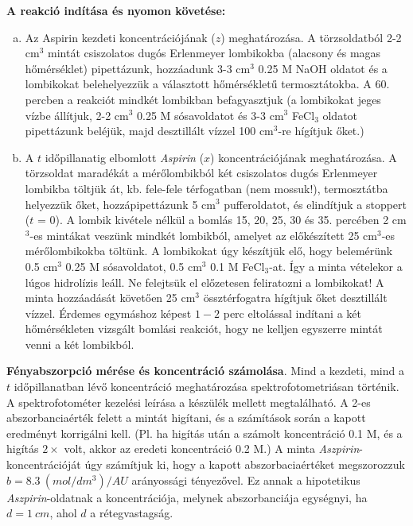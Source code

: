 \textbf{A reakció indítása és nyomon követése:}

\begin{enumerate}[(a)]
\item Az Aspirin kezdeti koncentrációjának ($z$) meghatározása. A törzsoldatból 2-2 cm$^3$ mintát csiszolatos dugós Erlenmeyer lombikokba (alacsony és magas hőmérséklet) pipettázunk, hozzáadunk 3-3 cm$^3$ 0.25 M NaOH oldatot és a lombikokat belehelyezzük a választott hőmérsékletű termosztátokba. A 60. percben a reakciót mindkét lombikban befagyasztjuk (a lombikokat jeges vízbe állítjuk, 2-2 cm$^3$ 0.25 M sósavoldatot és 3-3 cm$^3$ FeCl$_3$ oldatot pipettázunk beléjük, majd desztillált vízzel 100 cm$^3$-re hígítjuk őket.)

\item A $t$ időpillanatig elbomlott \emph{Aspirin} ($x$) koncentrációjának meghatározása. A törzsoldat maradékát a mérőlombikból két csiszolatos dugós Erlenmeyer lombikba töltjük át, kb. fele-fele térfogatban (nem mossuk!), termosztátba helyezzük őket, hozzápipettázunk 5 cm$^3$ pufferoldatot, és elindítjuk a stoppert ($t$ = 0). A lombik kivétele nélkül a bomlás 15, 20, 25, 30 és 35. percében 2 cm$^3$-es mintákat veszünk mindkét lombikból, amelyet az előkészített 25 cm$^3$-es mérőlombikokba töltünk. A lombikokat úgy készítjük elő, hogy belemérünk 0.5 cm$^3$ 0.25 M sósavoldatot, 0.5 cm$^3$ 0.1 M FeCl$_3$-at. Így a minta vételekor a lúgos hidrolízis leáll. Ne felejtsük el előzetesen feliratozni a lombikokat! A minta hozzáadását követően 25 cm$^3$ össztérfogatra hígítjuk őket desztillált vízzel. Érdemes egymáshoz képest $1 - 2$ perc eltolással indítani a két hőmérsékleten vizsgált bomlási reakciót, hogy ne kelljen egyszerre mintát venni a két lombikból.
\end{enumerate}

\textbf{Fényabszorpció mérése és koncentráció számolása}. Mind a kezdeti, mind a $t$ időpillanatban lévő koncentráció meghatározása spektrofotometriásan történik. A spektrofotométer kezelési leírása a készülék mellett megtalálható. A 2-es abszorbanciaérték felett a mintát higítani, és a számítások során a kapott eredményt korrigálni kell. (Pl. ha higítás után a számolt koncentráció 0.1 M, és a higítás $2\times$ volt, akkor az eredeti koncentráció 0.2 M.) A minta \emph{Aszpirin}-koncentrációját úgy számítjuk ki, hogy a kapott abszorbaciaértéket megszorozzuk $b = 8.3~(mol/dm^3) / AU$ arányossági tényezővel. Ez annak a hipotetikus \emph{Aszpirin}-oldatnak a koncentrációja, melynek abszorbanciája egységnyi, ha $d = 1~cm$, ahol $d$ a rétegvastagság.


